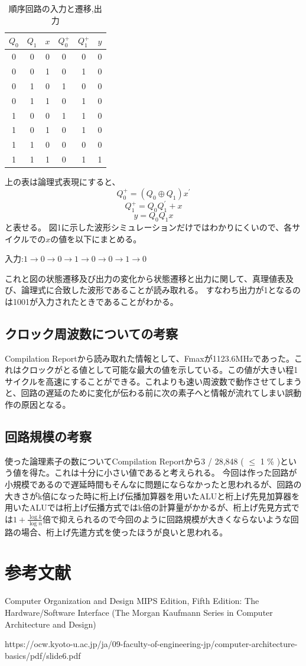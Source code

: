 \documentclass{jsarticle}
\begin{document}
\begin{table}
    \caption{順序回路の入力と遷移,出力}
    \centering
    \begin{tabular}{|c|c|c||c|c|c|}\hline
        $Q_0$&$Q_1$&$x$&$Q_{0}^{+}$&$Q_{1}^{+}$&$y$ \\ \hline \hline
        0&0&0&0&0&0 \\ \hline
        0&0&1&0&1&0 \\ \hline
        0&1&0&1&0&0 \\ \hline
        0&1&1&0&1&0 \\ \hline
        1&0&0&1&1&0 \\ \hline
        1&0&1&0&1&0 \\ \hline
        1&1&0&0&0&0 \\ \hline
        1&1&1&0&1&1 \\ \hline
    \end{tabular}
\end{table}
上の表は論理式表現にすると、
\begin{equation}
    Q_{0}^{+} = (Q_{0} \oplus Q_{1})x^{'}
\end{equation}
\begin{equation}
    Q_{1}^{+} = Q_{0}Q_{1}^{'} + x
\end{equation}
\begin{equation}
    y = Q_{0}Q_{1}x
\end{equation}
と表せる。
図1に示した波形シミュレーションだけではわかりにくいので、各サイクルでの$x$の値を以下にまとめる。

入力:$1 \rightarrow 0 \rightarrow 0 \rightarrow 1 \rightarrow 0 \rightarrow 0 \rightarrow 1 \rightarrow 0$

これと図の状態遷移及び出力の変化から状態遷移と出力に関して、真理値表及び、論理式に合致した波形であることが読み取れる。
すなわち出力が1となるのは1001が入力されたときであることがわかる。

\subsection{クロック周波数についての考察}
Compilation Reportから読み取れた情報として、Fmaxが1123.6MHzであった。これはクロックがとる値として可能な最大の値を示している。この値が大きい程1サイクルを高速にすることができる。これよりも速い周波数で動作させてしまうと、回路の遅延のために変化が伝わる前に次の素子へと情報が流れてしまい誤動作の原因となる。
\subsection{回路規模の考察}
使った論理素子の数についてCompilation Reportから3 / 28,848 ( $\leq$ 1 \% )という値を得た。これは十分に小さい値であると考えられる。
今回は作った回路が小規模であるので遅延時間もそんなに問題にならなかったと思われるが、回路の大きさがk倍になった時に桁上げ伝播加算器を用いたALUと桁上げ先見加算器を用いたALUでは桁上げ伝播方式ではk倍の計算量がかかるが、桁上げ先見方式では$1 + \frac{\log{k}}{\log{n}}$倍で抑えられるので今回のように回路規模が大きくならないような回路の場合、桁上げ先遣方式を使ったほうが良いと思われる。

\section{参考文献}
Computer Organization and Design MIPS Edition, Fifth Edition: The Hardware/Software Interface (The Morgan Kaufmann Series in Computer Architecture and Design)

https://ocw.kyoto-u.ac.jp/ja/09-faculty-of-engineering-jp/computer-architecture-basics/pdf/slide6.pdf
\end{document}

